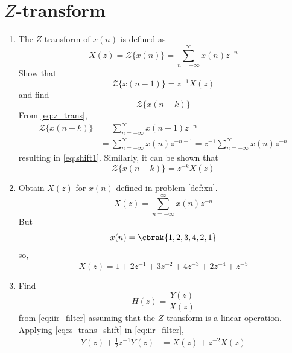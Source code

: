 \documentclass[journal,12pt,twocolumn]{IEEEtran}
\renewcommand\thesection{\arabic{section}}
\begin{document}
\section{$Z$-transform}
\begin{enumerate}[label=\thesection.\arabic*]
\item The $Z$-transform of $x(n)$ is defined as
%
\begin{equation}
\label{eq:z_trans}
X(z)={\mathcal {Z}}\{x(n)\}=\sum _{n=-\infty }^{\infty }x(n)z^{-n}
\end{equation}
%
Show that
\begin{equation}
\label{eq:shift1}
{\mathcal {Z}}\{x(n-1)\} = z^{-1}X(z)
\end{equation}
and find
\begin{equation}
	{\mathcal {Z}}\{x(n-k)\} 
\end{equation}
\solution From \eqref{eq:z_trans},
\begin{align}
{\mathcal {Z}}\{x(n-k)\} &=\sum _{n=-\infty }^{\infty }x(n-1)z^{-n}
\\
&=\sum _{n=-\infty }^{\infty }x(n)z^{-n-1} = z^{-1}\sum _{n=-\infty }^{\infty }x(n)z^{-n}
\end{align}
resulting in \eqref{eq:shift1}. Similarly, it can be shown that
%
\begin{equation}
\label{eq:z_trans_shift}
	{\mathcal {Z}}\{x(n-k)\} = z^{-k}X(z)
\end{equation}
\item Obtain $X(z)$ for $x(n)$ defined in problem 
	\ref{def:xn}.
\solution
\begin{equation}
    X(z) = \sum_{n=-\infty}^{\infty}x(n)z^{-n}
\end{equation}
But
\begin{equation}
    x(n) = \cbrak{1,2,3,4,2,1}
\end{equation}
so,
\begin{equation}
    X(z) = 1 + 2z^{-1} + 3z^{-2} + 4z^{-3} + 2z^{-4} + z^{-5}
\end{equation}
\item Find
%
\begin{equation}
H(z) = \frac{Y(z)}{X(z)}
\end{equation}
%
from  \eqref{eq:iir_filter} assuming that the $Z$-transform is a linear operation.
\\
\solution  Applying \eqref{eq:z_trans_shift} in \eqref{eq:iir_filter},
\begin{align}
Y(z) + \frac{1}{2}z^{-1}Y(z) &= X(z)+z^{-2}X(z)
\\

\end{align}
\end{enumerate}
\end{document}
